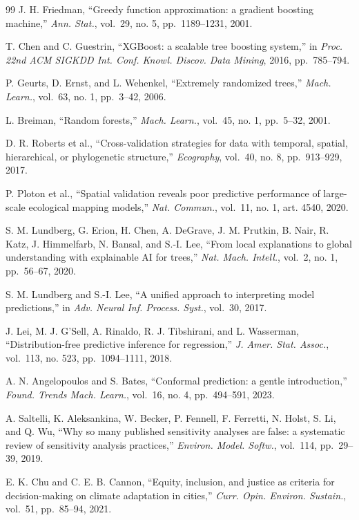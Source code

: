 \begin{thebibliography}{99}
 J. H. Friedman, ``Greedy function approximation: a gradient boosting machine,'' \emph{Ann. Stat.},
vol.~29, no. 5, pp.~1189--1231, 2001.


 T. Chen and C. Guestrin, ``XGBoost: a scalable tree boosting system,'' in \emph{Proc. 22nd ACM SIGKDD
Int. Conf. Knowl. Discov. Data Mining}, 2016, pp.~785--794.


 P. Geurts, D. Ernst, and L. Wehenkel, ``Extremely randomized trees,'' \emph{Mach. Learn.}, vol.~63,
no. 1, pp.~3--42, 2006.


 L. Breiman, ``Random forests,'' \emph{Mach. Learn.}, vol.~45, no. 1, pp.~5--32, 2001.


 D. R. Roberts et al., ``Cross-validation strategies for data with temporal, spatial, hierarchical,
or phylogenetic structure,'' \emph{Ecography}, vol.~40, no. 8, pp.~913--929, 2017.


 P. Ploton et al., ``Spatial validation reveals poor predictive performance of large-scale ecological
mapping models,'' \emph{Nat. Commun.}, vol.~11, no. 1, art. 4540, 2020.


 S. M. Lundberg, G. Erion, H. Chen, A. DeGrave, J. M. Prutkin, B. Nair, R. Katz, J. Himmelfarb,
N. Bansal, and S.-I. Lee, ``From local explanations to global understanding with explainable AI for
trees,'' \emph{Nat. Mach. Intell.}, vol.~2, no. 1, pp.~56--67, 2020.


 S. M. Lundberg and S.-I. Lee, ``A unified approach to interpreting model predictions,'' in \emph{Adv.
Neural Inf. Process. Syst.}, vol.~30, 2017.


 J. Lei, M. J. G'Sell, A. Rinaldo, R. J. Tibshirani, and L. Wasserman, ``Distribution-free
predictive inference for regression,'' \emph{J. Amer. Stat. Assoc.}, vol.~113, no. 523, pp.~1094--1111, 2018.


 A. N. Angelopoulos and S. Bates, ``Conformal prediction: a gentle introduction,'' \emph{Found. Trends
Mach. Learn.}, vol.~16, no. 4, pp.~494--591, 2023.


 A. Saltelli, K. Aleksankina, W. Becker, P. Fennell, F. Ferretti, N. Holst, S. Li, and Q. Wu, ``Why
so many published sensitivity analyses are false: a systematic review of sensitivity analysis
practices,'' \emph{Environ. Model. Softw.}, vol.~114, pp.~29--39, 2019.


 E. K. Chu and C. E. B. Cannon, ``Equity, inclusion, and justice as criteria for decision-making on
climate adaptation in cities,'' \emph{Curr. Opin. Environ. Sustain.}, vol.~51, pp.~85--94, 2021.



\end{thebibliography}

